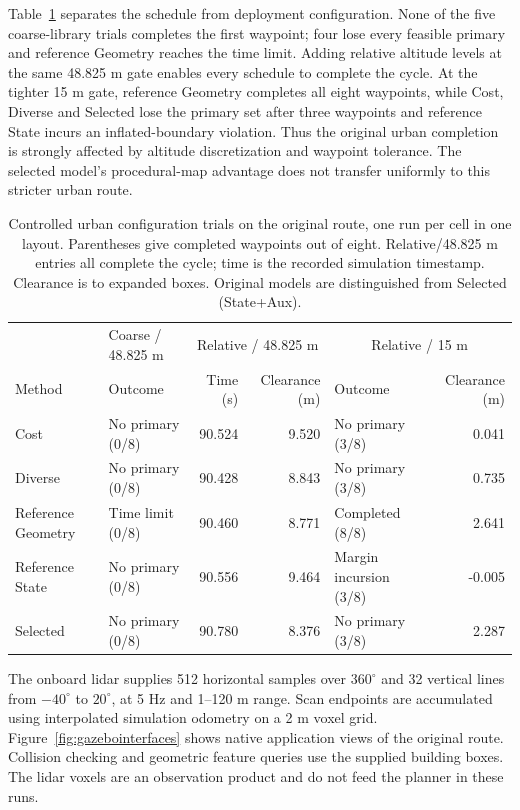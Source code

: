 \documentclass[journal]{IEEEtran}
\begin{document}
Table~\ref{tab:citycontrolled} separates the schedule from deployment configuration. None of the five coarse-library trials completes the first waypoint; four lose every feasible primary and reference Geometry reaches the time limit. Adding relative altitude levels at the same 48.825 m gate enables every schedule to complete the cycle. At the tighter 15 m gate, reference Geometry completes all eight waypoints, while Cost, Diverse and Selected lose the primary set after three waypoints and reference State incurs an inflated-boundary violation. Thus the original urban completion is strongly affected by altitude discretization and waypoint tolerance. The selected model's procedural-map advantage does not transfer uniformly to this stricter urban route.

\begin{table}[!t]
\centering\small
\caption{Controlled urban configuration trials on the original route, one run per cell in one layout. Parentheses give completed waypoints out of eight. Relative/48.825 m entries all complete the cycle; time is the recorded simulation timestamp. Clearance is to expanded boxes. Original models are distinguished from Selected (State+Aux).}
\label{tab:citycontrolled}
\begin{tabular}{llrrlr}
\toprule
 & Coarse / 48.825 m & \multicolumn{2}{c}{Relative / 48.825 m} & \multicolumn{2}{c}{Relative / 15 m}\\
Method & Outcome & Time (s) & Clearance (m) & Outcome & Clearance (m)\\
\midrule
Cost & No primary (0/8) & 90.524 & 9.520 & No primary (3/8) & 0.041 \\
Diverse & No primary (0/8) & 90.428 & 8.843 & No primary (3/8) & 0.735 \\
Reference Geometry & Time limit (0/8) & 90.460 & 8.771 & Completed (8/8) & 2.641 \\
Reference State & No primary (0/8) & 90.556 & 9.464 & Margin incursion (3/8) & -0.005 \\
Selected & No primary (0/8) & 90.780 & 8.376 & No primary (3/8) & 2.287 \\
\bottomrule
\end{tabular}
\end{table}

The onboard lidar supplies 512 horizontal samples over $360^\circ$ and 32 vertical lines from $-40^\circ$ to $20^\circ$, at 5 Hz and 1--120 m range. Scan endpoints are accumulated using interpolated simulation odometry on a 2 m voxel grid. Figure~\ref{fig:gazebointerfaces} shows native application views of the original route. Collision checking and geometric feature queries use the supplied building boxes. The lidar voxels are an observation product and do not feed the planner in these runs.
\end{document}
